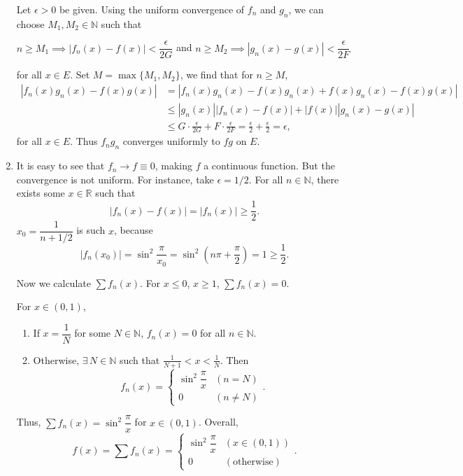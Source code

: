 \documentclass[12pt]{report}
\newcommand{\numl}[1]{\item[\large\textbf{\sffamily #1.}]}
\newcommand{\ds}{\displaystyle}
\newcommand{\abs}[1]{\left| #1 \right|}
\newcommand{\ra}{\rightarrow}
\newcommand{\R}{\mathbb{R}}
\newcommand{\N}{\mathbb{N}}
\let\oldexists\exists
\renewcommand{\exists}{\oldexists\,}
\begin{document}
\begin{enumerate}
    Let \(\epsilon > 0\) be given. Using the uniform convergence of \(f_n\) and \(g_n\), we can choose \(M_1, M_2 \in \N\) such that
    \begin{center}
        \(n \geq M_1 \implies \abs{f_n(x) - f(x)} < \dfrac{\epsilon}{2G}\) and \(n \geq M_2 \implies \abs{g_n(x) - g(x)} < \dfrac{\epsilon}{2F}\)
    \end{center}
    for all \(x \in E\). Set \(M = \max\{M_1, M_2\}\), we find that for \(n \geq M\),
    \[
        \begin{aligned}
            \abs{f_n(x)g_n(x) - f(x)g(x)} & = \abs{f_n(x)g_n(x) - f(x)g_n(x) + f(x)g_n(x) - f(x)g(x)}                                                            \\
                                          & \leq \abs{g_n(x)}\abs{f_n(x) - f(x)} + \abs{f(x)} \abs{g_n(x) - g(x)}                                                \\
                                          & \leq G \cdot \frac{\epsilon}{2G} + F \cdot \frac{\epsilon}{2F} = \frac{\epsilon}{2} + \frac{\epsilon}{2} = \epsilon,
        \end{aligned}
    \]
    for all \(x \in E\). Thus \(f_ng_n\) converges uniformly to \(fg\) on \(E\).

    \numl{3} It is easy to see that \(f_n \ra f \equiv 0\), making \(f\) a continuous function. But the convergence is not uniform. For instance, take \(\epsilon = 1/2\). For all \(n \in \N\), there exists some \(x\in \R\) such that
    \[
        \abs{f_n(x) - f(x)} = \abs{f_n(x)} \geq \frac{1}{2}.
    \]
    \(x_0 = \dfrac{1}{n + 1/2}\) is such \(x\), because
    \[
        \abs{f_n(x_0)} = \sin^2 \dfrac{\pi}{x_0} = \sin^2 \left(n\pi + \frac{\pi}{2}\right) = 1 \geq \frac{1}{2}.
    \]

    Now we calculate \(\sum f_n(x)\). For \(x \leq 0\), \(x \geq 1\), \(\sum f_n(x) = 0\).

    For \(x \in (0, 1)\),
    \begin{enumerate}
        \item If \(x = \dfrac{1}{N}\) for some \(N \in \N\), \(f_n(x) = 0\) for all \(n \in \N\).
        \item Otherwise, \(\exists N \in \N\) such that \(\ds \frac{1}{N + 1} < x < \frac{1}{N}\). Then
              \[
                  f_n(x) = \begin{cases}
                      \sin^2 \dfrac{\pi}{x} & (n = N)    \\
                      0                     & (n \neq N)
                  \end{cases}.
              \]
    \end{enumerate}
    Thus, \(\sum f_n(x) = \sin^2 \dfrac{\pi}{x}\) for \(x \in (0, 1)\). Overall,
    \[
        f(x) = \sum f_n(x) = \begin{cases}
            \sin^2 \dfrac{\pi}{x} & (x \in (0, 1))     \\
            0                     & (\text{otherwise})
        \end{cases}.
    \]


\end{enumerate}
\end{document}
